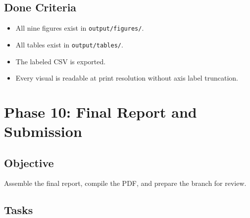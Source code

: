 \documentclass[11pt]{article}
\begin{document}
\subsection{Done Criteria}

\begin{itemize}
  \item All nine figures exist in \texttt{output/figures/}.
  \item All tables exist in \texttt{output/tables/}.
  \item The labeled CSV is exported.
  \item Every visual is readable at print resolution without axis label truncation.
\end{itemize}

\newpage
\section{Phase 10: Final Report and Submission}

\subsection{Objective}

Assemble the final report, compile the PDF, and prepare the branch for review.

\subsection{Tasks}
\end{document}
